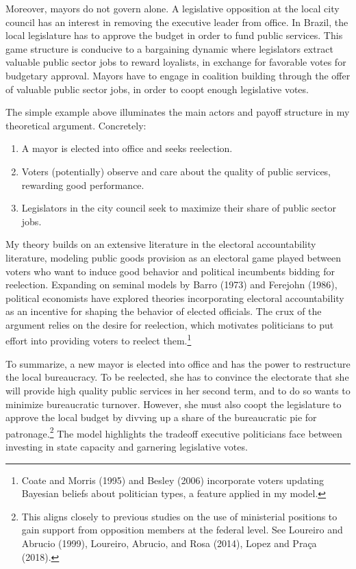 \documentclass[12pt,]{article}
\providecommand{\tightlist}{%
  \setlength{\itemsep}{0pt}\setlength{\parskip}{0pt}}
\let\rmarkdownfootnote\footnote%
\def\footnote{\protect\rmarkdownfootnote}
\begin{document}
Moreover, mayors do not govern alone. A legislative opposition at the
local city council has an interest in removing the executive leader from
office. In Brazil, the local legislature has to approve the budget in
order to fund public services. This game structure is conducive to a
bargaining dynamic where legislators extract valuable public sector jobs
to reward loyalists, in exchange for favorable votes for budgetary
approval. Mayors have to engage in coalition building through the offer
of valuable public sector jobs, in order to coopt enough legislative
votes.

The simple example above illuminates the main actors and payoff
structure in my theoretical argument. Concretely:

\begin{enumerate}
\def\labelenumi{\arabic{enumi}.}
\tightlist
\item
  A mayor is elected into office and seeks reelection.
\item
  Voters (potentially) observe and care about the quality of public
  services, rewarding good performance.
\item
  Legislators in the city council seek to maximize their share of public
  sector jobs.
\end{enumerate}

My theory builds on an extensive literature in the electoral
accountability literature, modeling public goods provision as an
electoral game played between voters who want to induce good behavior
and political incumbents bidding for reelection. Expanding on seminal
models by Barro (1973) and Ferejohn (1986), political economists have
explored theories incorporating electoral accountability as an incentive
for shaping the behavior of elected officials. The crux of the argument
relies on the desire for reelection, which motivates politicians to put
effort into providing voters to reelect them.\footnote{Coate and Morris
  (1995) and Besley (2006) incorporate voters updating Bayesian beliefs
  about politician types, a feature applied in my model.}

To summarize, a new mayor is elected into office and has the power to
restructure the local bureaucracy. To be reelected, she has to convince
the electorate that she will provide high quality public services in her
second term, and to do so wants to minimize bureaucratic turnover.
However, she must also coopt the legislature to approve the local budget
by divving up a share of the bureaucratic pie for patronage.\footnote{This
  aligns closely to previous studies on the use of ministerial positions
  to gain support from opposition members at the federal level. See
  Loureiro and Abrucio (1999), Loureiro, Abrucio, and Rosa (2014), Lopez
  and Praça (2018).} The model highlights the tradeoff executive
politicians face between investing in state capacity and garnering
legislative votes.
\end{document}
